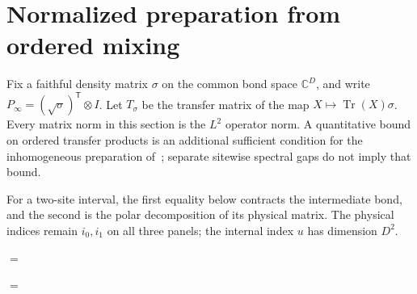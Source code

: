 \section{Normalized preparation from ordered mixing}
\label{sec:ldp_inhomogeneous_mixing}

Fix a faithful density matrix $\sigma$ on the common bond space
$\mathbb C^D$, and write $P_\infty=(\sqrt\sigma)^\mathsf T\otimes I$.
Let $T_\sigma$ be the transfer matrix of the map
$X\mapsto\operatorname{Tr}(X)\sigma$. Every matrix norm in this section
is the $L^2$ operator norm. A quantitative bound on ordered
transfer products is an additional sufficient condition for the
inhomogeneous preparation of~\cite{Malz2024Preparation}; separate
sitewise spectral gaps do not imply that bound.

For a two-site interval, the first equality below contracts the
intermediate bond, and the second is the polar decomposition of its
physical matrix. The physical indices remain $i_0,i_1$ on all three
panels; the internal index $u$ has dimension $D^2$.
\begin{center}
    \tenkzkernel
    \begin{tenkzequation}
        \begin{tenkz}[rows={wire}, cols=2]
        \end{tenkz}
        $=$
        \begin{tenkz}[rows={wire}, cols=2, bonds=none]
        \end{tenkz}
        $=$
        \begin{tenkz}[rows={wire,wire}, cols=2, bonds=none, align=2]
        \end{tenkz}
    \end{tenkzequation}
\end{center}

